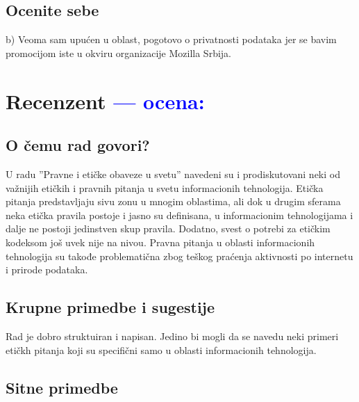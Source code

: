 \documentclass[a4paper]{report}
\newcommand{\odgovor}[1]{\textcolor{blue}{#1}}
\begin{document}
\section{Ocenite sebe}
b) Veoma sam upućen u oblast, pogotovo o privatnosti podataka jer se bavim promocijom iste u okviru organizacije Mozilla Srbija.
\chapter{Recenzent \odgovor{--- ocena:} }


\section{O čemu rad govori?}

U radu ''Pravne i etičke obaveze u svetu'' navedeni su i prodiskutovani neki od važnijih etičkih i pravnih pitanja u svetu informacionih tehnologija. Etička pitanja predstavljaju sivu zonu u mnogim oblastima, ali dok u drugim sferama neka etička pravila postoje i jasno su definisana, u informacionim tehnologijama i dalje ne postoji jedinstven skup pravila. Dodatno, svest o potrebi za etičkim kodeksom još uvek nije na nivou. Pravna pitanja u oblasti informacionih tehnologija su takođe problematična zbog teškog praćenja aktivnosti po internetu i prirode podataka.

\section{Krupne primedbe i sugestije}

Rad je dobro struktuiran i napisan. Jedino bi mogli da se navedu neki primeri etičkh pitanja koji su specifični samo u oblasti informacionih tehnologija. 

\section{Sitne primedbe}
\end{document}
